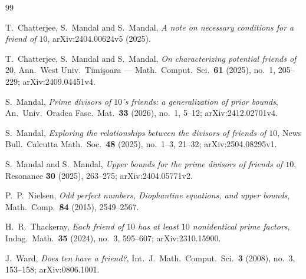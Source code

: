 \documentclass[11pt,a4paper]{article}
\theoremstyle{plain}
\theoremstyle{definition}
\begin{document}
\begin{thebibliography}{99}

 T.~Chatterjee, S.~Mandal and S.~Mandal,
\emph{A note on necessary conditions for a friend of $10$},
arXiv:2404.00624v5 (2025).

 T.~Chatterjee, S.~Mandal and S.~Mandal,
\emph{On characterizing potential friends of $20$},
Ann.\ West Univ.\ Timi\c{s}oara --- Math.\ Comput.\ Sci.\ \textbf{61} (2025), no.~1,
205--229; arXiv:2409.04451v4.

 S.~Mandal,
\emph{Prime divisors of $10$'s friends: a generalization of prior bounds},
An.\ Univ.\ Oradea Fasc.\ Mat.\ \textbf{33} (2026), no.~1, 5--12; arXiv:2412.02701v4.

 S.~Mandal,
\emph{Exploring the relationships between the divisors of friends of $10$},
News Bull.\ Calcutta Math.\ Soc.\ \textbf{48} (2025), no.~1--3, 21--32;
arXiv:2504.08295v1.

 S.~Mandal and S.~Mandal,
\emph{Upper bounds for the prime divisors of friends of $10$},
Resonance \textbf{30} (2025), 263--275; arXiv:2404.05771v2.

 P.~P.~Nielsen,
\emph{Odd perfect numbers, Diophantine equations, and upper bounds},
Math.\ Comp.\ \textbf{84} (2015), 2549--2567.

 H.~R.~Thackeray,
\emph{Each friend of $10$ has at least $10$ nonidentical prime factors},
Indag.\ Math.\ \textbf{35} (2024), no.~3, 595--607; arXiv:2310.15900.

 J.~Ward,
\emph{Does ten have a friend?}, Int.\ J.\ Math.\ Comput.\ Sci.\ \textbf{3} (2008),
no.~3, 153--158; arXiv:0806.1001.

\end{thebibliography}
\end{document}
